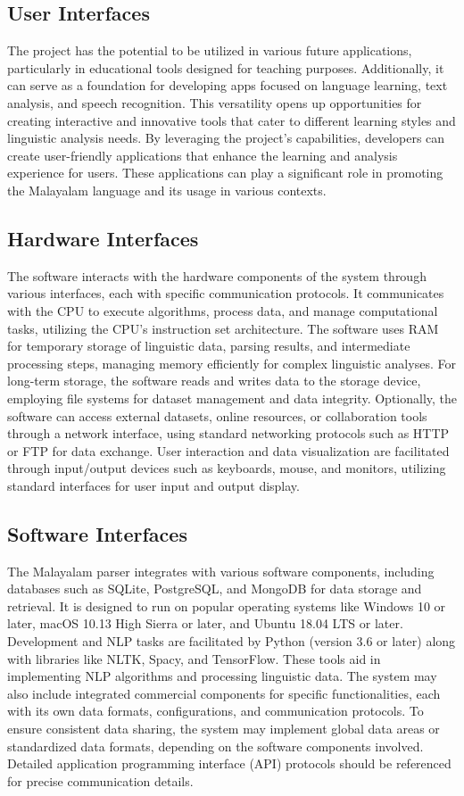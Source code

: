 \documentclass[12pt]{article}
\begin{document}
	\subsection{User Interfaces}
	The project has the potential to be utilized in various future applications, particularly in
	educational tools designed for teaching purposes. Additionally, it can serve as a foundation
	for developing apps focused on language learning, text analysis, and speech recognition.
	This versatility opens up opportunities for creating interactive and innovative tools that
	cater to different learning styles and linguistic analysis needs. By leveraging the project's
	capabilities, developers can create user-friendly applications that enhance the learning and
	analysis experience for users. These applications can play a significant role in promoting
	the Malayalam language and its usage in various contexts.
	
	\subsection{Hardware Interfaces}
	The software interacts with the hardware components of the system through various
	interfaces, each with specific communication protocols. It communicates with the CPU to
	execute algorithms, process data, and manage computational tasks, utilizing the CPU's
	instruction set architecture. The software uses RAM for temporary storage of linguistic
	data, parsing results, and intermediate processing steps, managing memory efficiently for
	complex linguistic analyses. For long-term storage, the software reads and writes data to
	the storage device, employing file systems for dataset management and data integrity.
	Optionally, the software can access external datasets, online resources, or collaboration
	tools through a network interface, using standard networking protocols such as HTTP or
	FTP for data exchange. User interaction and data visualization are facilitated through
	input/output devices such as keyboards, mouse, and monitors, utilizing standard interfaces
	for user input and output display.
	
	\subsection{Software Interfaces}
	The Malayalam parser integrates with various software components, including databases
	such as SQLite, PostgreSQL, and MongoDB for data storage and retrieval. It is designed
	to run on popular operating systems like Windows 10 or later, macOS 10.13 High Sierra or
	later, and Ubuntu 18.04 LTS or later. Development and NLP tasks are facilitated by Python
	(version 3.6 or later) along with libraries like NLTK, Spacy, and TensorFlow. These tools
	aid in implementing NLP algorithms and processing linguistic data. The system may also
	include integrated commercial components for specific functionalities, each with its own
	data formats, configurations, and communication protocols. To ensure consistent data
	sharing, the system may implement global data areas or standardized data formats,
	depending on the software components involved. Detailed application programming
	interface (API) protocols should be referenced for precise communication details.
	
\end{document}
